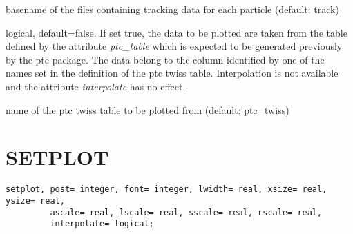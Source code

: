 \begin{madlist}
    basename of the files containing
     tracking data for each particle (default: track)  

    logical, default=false. If set true, the data to be
     plotted are taken from the table defined by the attribute
     \textit{ptc\_table} which is expected to be generated previously by
     the ptc package. The data belong to the column identified by one of
     the names set in the definition of the ptc twiss
     table. Interpolation is not available and the attribute
     \textit{interpolate} has no effect.   

    name of the ptc twiss table to be plotted from
     (default: ptc\_twiss)  

\end{madlist}



\section{SETPLOT}
\begin{verbatim}
setplot, post= integer, font= integer, lwidth= real, xsize= real, ysize= real,
         ascale= real, lscale= real, sscale= real, rscale= real,
         interpolate= logical;
\end{verbatim} 

